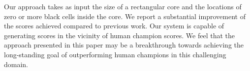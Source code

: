 
Our approach takes as input the size of a rectangular core
and the locations of zero or more black cells inside the core.
We report a substantial improvement of the scores achieved compared
to previous work.
Our system is capable of generating scores in the vicinity of human champion scores.
We feel that the approach presented in this paper may be a breakthrough towards achieving the long-standing goal of outperforming human champions in this challenging domain.